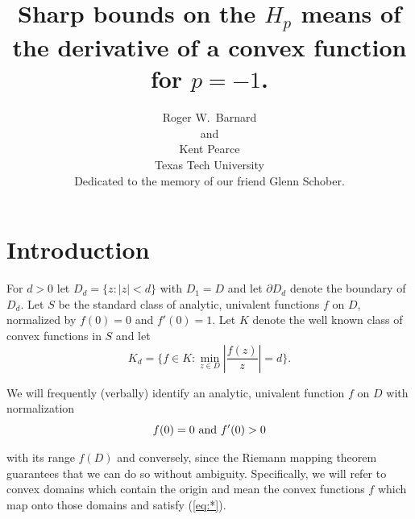 \newtheorem{conjecture}{Conjecture}%
\newtheorem{example}{Example}%
\newtheorem{corollary}{Corollary}%
\newtheorem{lemma}{Lemma}%
\newtheorem{theorem}{Theorem}%
\newtheorem{proposition}{Proposition}%
\newtheorem{definition}{Definition}%
\newtheorem{notations}{Notations}%
\newtheorem{assumption}{Assumption}%
\newtheorem{remark}{Remark}%
\newtheorem{problem}{Problem}%






\title{Sharp bounds on the $H_p$ means of the derivative of a convex
function for $p=-1$.}
\author{Roger W.\ Barnard\\ and\\  Kent Pearce\\
Texas Tech University\\[2ex]
Dedicated to the memory of our friend Glenn Schober.}

\date{}
\maketitle

\section{Introduction}

For $d>0$ let $D_d=\{z:|z|<d\}$ with $D_1=D$ and let $\partial D_d$
denote the boundary of $D_d$.  Let $S$ be the standard class of
analytic, univalent functions $f$ on $D$, normalized by $f(0)=0$ and
$f'(0)=1$.  Let $K$ denote the well known class of convex functions
in $S$ and let 
\begin{equation}
\label{eq:1}
K_d=\{f\in K: \min_{z\in D} \left|\frac{f(z)}{z}\right|=d\}.
\end{equation}

We will frequently (verbally) identify an analytic, univalent
function $f$ on $D$ with normalization
\renewcommand{\theequation}{\fnsymbol{equation}}
\setcounter{equation}{0}
\begin{equation}
\label{eq:*}
f(0)=0\ {\rm and}\ f'(0)>0
\end{equation}
\renewcommand{\theequation}{\arabic{equation}}
\setcounter{equation}{1}

\noindent with its range $f(D)$ and conversely, since the Riemann mapping
theorem guarantees that we can do so without ambiguity.
Specifically, we will refer to convex domains which contain the
origin and mean the convex functions $f$ which map onto those domains
and satisfy (\ref{eq:*}).

